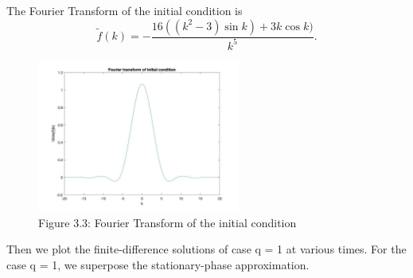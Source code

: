 \documentclass[a4paper,11pt]{article}
\begin{document}
The Fourier Transform of the initial condition is
$$\tilde{f}(k) = -\frac{16((k^2-3)\sin k)+3k\cos k)}{k^5}.$$
\begin{figure}[H]
 \center
 \includegraphics[width = 0.5\linewidth, height =5cm]{Q3(2).jpg}
 \caption{Figure 3.3: Fourier Transform of the initial condition}
 \label{Q3(2)}
\end{figure}
Then we plot the finite-difference solutions of case q = 1 at various times. For the case q = 1, we superpose the stationary-phase approximation. 
\end{document}
